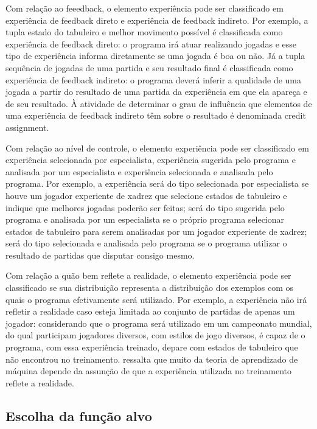 Com relação ao feeedback, o elemento experiência pode ser classificado em experiência de feedback direto e experiência de feedback indireto. Por exemplo, a tupla estado do tabuleiro e melhor movimento possível é classificada como experiência de feedback direto: o programa irá atuar realizando jogadas e esse tipo de experiência informa diretamente se uma jogada é boa ou não. Já a tupla sequência de jogadas de uma partida e seu resultado final é classificada como experiência de feedback indireto: o programa deverá inferir a qualidade de uma jogada a partir do resultado de uma partida da experiência em que ela apareça e de seu resultado. À atividade de determinar o grau de influência que elementos de uma experiência de feedback indireto têm sobre o resultado é denominada credit assignment.

Com relação ao nível de controle, o elemento experiência pode ser classificado em experiência selecionada por especialista, experiência sugerida pelo programa e analisada por um especialista e experiência selecionada e analisada pelo programa. Por exemplo, a experiência será do tipo selecionada por especialista se houve um jogador experiente de xadrez que selecione estados de tabuleiro e indique que melhores jogadas poderão ser feitas; será do tipo sugerida pelo programa e analisada por um especialista se o próprio programa selecionar estados de tabuleiro para serem analisadas por um jogador experiente de xadrez; será do tipo selecionada e analisada pelo programa se o programa utilizar o resultado de partidas que disputar consigo mesmo.

Com relação a quão bem reflete a realidade, o elemento experiência pode ser classificado se sua distribuição representa a distribuição dos exemplos com os quais o programa efetivamente será utilizado. Por exemplo, a experiência não irá refletir a realidade caso esteja limitada ao conjunto de partidas de apenas um jogador: considerando que o programa será utilizado em um campeonato mundial, do qual participam jogadores diversos, com estilos de jogo diversos, é capaz de o programa, com essa experiência treinado, depare com estados de tabuleiro que não encontrou no treinamento. \cite{Tom_mitchell} ressalta que muito da teoria de aprendizado de máquina depende da assunção de que a experiência utilizada no treinamento reflete a realidade.

\subsection{Escolha da função alvo}

